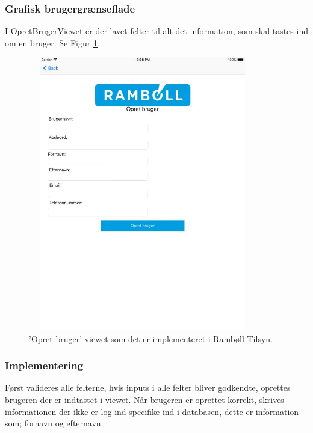 \subsubsection{Grafisk brugergrænseflade}
I OpretBrugerViewet er der lavet felter til alt det information, som skal tastes ind om en bruger. Se Figur \ref{fig:OpretBrugerView}
\begin{figure}[H] %
	\centering
	\includegraphics[height=12cm, width=10cm]{Design/Applikation/OpretBruger/OpretBrugerView}
	\caption{'Opret bruger' viewet som det er implementeret i Rambøll Tilsyn.}
	\label{fig:OpretBrugerView}
\end{figure}

\subsubsection{Implementering}
Først valideres alle felterne, hvis inputs i alle felter bliver godkendte, oprettes brugeren der er indtastet i viewet. Når brugeren er oprettet korrekt, skrives informationen der ikke er log ind specifike ind i databasen, dette er information som; fornavn og efternavn.


\clearpage